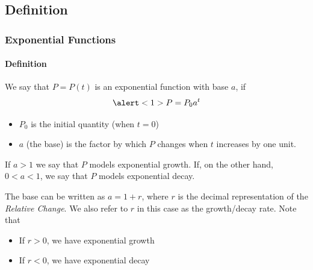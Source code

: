 \documentclass[9pt,xcolor=x11names,compress]{beamer}
\begin{document}
\subsection{Definition}

\begin{frame}[t]
\frametitle{Exponential Functions}\framesubtitle{Definition}
We say that $P=P(t)$ is an \alert<1>{exponential function} with base $a$, if 
\begin{equation*}
   \alert<1>{P=P_0 a^t}
\end{equation*}
\pause
\begin{itemize}
    \item<2-> \alert<2>{$P_0$ is the initial quantity (when $t=0$)}
    \item<3-> \alert<3>{$a$ (the base) is the factor by which $P$ changes when $t$ increases by one unit.}
\end{itemize}
\pause\pause
If $a>1$ we say that $P$ models \alert<4>{exponential growth}.  If, on the other hand, $0<a<1$, we say that $P$ models \alert<4>{exponential decay}.

\pause
The base can be written as $a=1+r$, where $r$ is the decimal representation of the \emph{Relative Change}.  We also refer to $r$ in this case as the \alert<5>{growth/decay rate}. \pause  Note that
\begin{itemize}
    \item If $r>0$, we have exponential growth
    \item If $r<0$, we have exponential decay
\end{itemize}
\end{frame}
\end{document}
